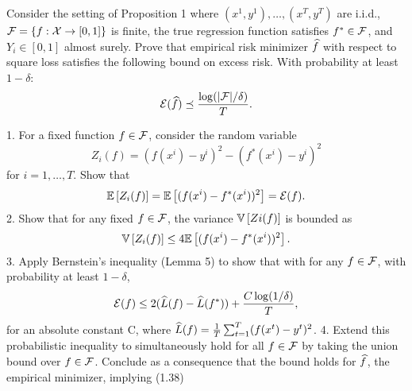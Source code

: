 \begin{exercise}[]{}
Consider the setting of Proposition 1 where $ (x^{1}, y^{1}),\ldots,(x^{T},y^{T})$ are i.i.d., $\mathcal{F} = \{f : \mathcal{X} \to [0,1] \}$ is finite,  
the true regression function satisfies $f^* \in \mathcal{F}$, and $Y_i \in [0, 1]$ almost surely. Prove that empirical risk minimizer $\widehat f$ with respect 
to square loss satisfies the following bound on excess risk. With probability at least $1 - \delta$:
\begin{equation*}
    \mathcal{E}(\widehat f) \preceq \frac{\log(|\mathcal{F}|/\delta)}{T}.
\end{equation*}
\end{exercise}

1. For a fixed function $f \in \mathcal{F}$, consider the random variable 
\[Z_i(f) = (f(x^i)-y^i)^2 -(f^*(x^i)-y^i)^2\]
 for $i=1,\ldots,T.$ Show that
 \[ \mathbb{E}\left[Z_i(f)\right] = \mathbb{E}\left[(f(x^i)- f^*(x^i))^2\right] = \mathcal{E}(f).\]
2. Show that for any fixed $f \in \mathcal{F}$, the variance $\mathbb{V}\left[Zi(f)\right]$ is bounded as
\[ \mathbb{V}\left[Z_i(f)\right]\leq 4\mathbb{E}\left[(f(x^i)-f^*(x^i))^2\right].\]
3. Apply Bernstein’s inequality (Lemma 5) to show that with for any $f \in \mathcal{F}$, with probability
at least $1-\delta$,
\[ \mathcal{E}(f) \leq 2(\widehat L(f)-\widehat L(f^*))+\frac{C \log(1/\delta)}{T},\] 
for an absolute constant C, where $\widehat L(f) = \frac{1}{T} \sum_{t=1}^T (f(x^t) - y^t)^2$.
4. Extend this probabilistic inequality to simultaneously hold for all $f \in \mathcal{F}$ by taking the 
union bound over $f \in \mathcal{F}$. Conclude as a consequence that the bound holds for $\widehat f$, the empirical minimizer, implying (1.38)
